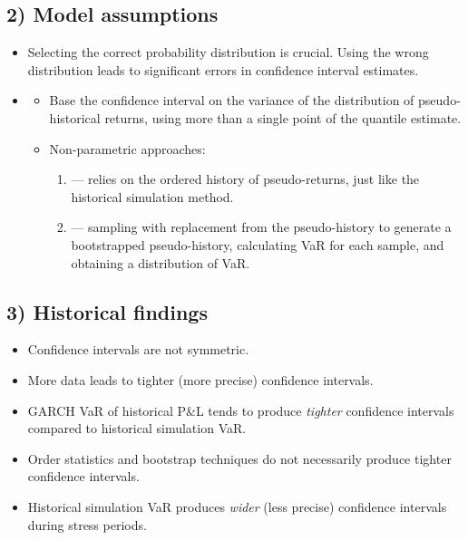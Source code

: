 \subsection{2) Model assumptions}
\begin{itemize}
\item {} Selecting the correct probability distribution is crucial.
      Using the wrong distribution leads to significant errors in confidence interval estimates.
\item {}
  \begin{itemize}
  \item Base the confidence interval on the variance of the distribution of pseudo-historical
        returns, using more than a single point of the quantile estimate.
  \item Non-parametric approaches:
    \begin{enumerate}[label=\alph*)]
    \item {} --- relies on the ordered history of pseudo-returns, just like
          the historical simulation method.
    \item {} --- sampling with replacement from the pseudo-history to
          generate a bootstrapped pseudo-history, calculating VaR for each sample, and obtaining
          a distribution of VaR.
    \end{enumerate}
  \end{itemize}
\end{itemize}

\subsection{3) Historical findings}
\begin{itemize}
\item {} Confidence intervals are not symmetric.
\item {} More data leads to tighter (more precise) confidence intervals.
\item {} GARCH VaR of historical P\&L tends to produce \textit{tighter}
      confidence intervals compared to historical simulation VaR.
\item {} Order statistics and bootstrap techniques do not
      necessarily produce tighter confidence intervals.
\item {} Historical simulation VaR produces \textit{wider} (less precise)
      confidence intervals during stress periods.
\end{itemize}


